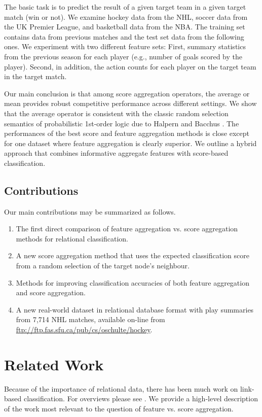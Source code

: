 \documentclass[conference]{IEEEtran}
\begin{document}
The basic task is to predict the result of a given target team in a given target match (win or not). We examine hockey data from the NHL, soccer data from the UK Premier League, and basketball data from the NBA. The training set contains data from previous matches and the test set data from the following ones. We experiment with two different feature sets: First, summary statistics from the previous season for each player (e.g., number of goals scored by the player). Second, in addition, the action counts for each player on the target team in the target match.

Our main conclusion is that among score aggregation operators, the average or mean provides robust competitive performance across different settings. We show that the average operator is consistent  with the classic random selection semantics of probabilistic 1st-order logic due to Halpern and Bacchus \cite{Halpern90,Bacchus90}. The performances of the best score and feature aggregation methods is close except for one dataset where feature aggregation is clearly superior. We outline a hybrid approach that combines informative aggregate features with score-based classification.

\subsection{Contributions}
Our main contributions may be summarized as follows.

\begin{enumerate}
\item The first direct comparison of feature aggregation vs. score aggregation methods for relational classification.
\item A new score aggregation method that uses the expected classification score from a random selection of the target node's neighbour.
\item Methods for improving classification accuracies of both feature aggregation and score aggregation.
\item A new real-world dataset in relational database format with play summaries from 7,714 NHL matches, available on-line from \url{ftp://ftp.fas.sfu.ca/pub/cs/oschulte/hockey}.
\end{enumerate}


\section{Related Work}
Because of the importance of relational data, there has been much work on link-based classification. For overviews please see \cite{han2009,Bina2012}. We provide a high-level description of the work most relevant to the question of feature vs. score aggregation.
\end{document}
